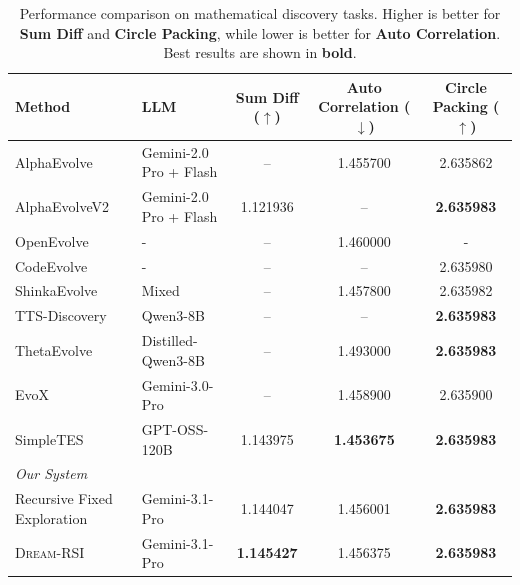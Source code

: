 
\begin{table}[t!]
\centering
\caption{
Performance comparison on mathematical discovery tasks.
Higher is better for \textbf{Sum Diff} and \textbf{Circle Packing}, while lower is better for \textbf{Auto Correlation}.
Best results are shown in \textbf{bold}.
}
\label{tab:downstream_results}
\small
\setlength{\tabcolsep}{1pt}
\renewcommand{\arraystretch}{1.15}
\vspace{0.1in}
\begin{tabular}{llccc}
\toprule
\textbf{Method}
& \textbf{LLM}
& \textbf{Sum Diff ($\uparrow$)}
& \textbf{Auto Correlation ($\downarrow$)}
& \textbf{Circle Packing ($\uparrow$)} \\
\midrule

AlphaEvolve
& Gemini-2.0 Pro + Flash 
& -- &  1.455700 &  2.635862 \\

AlphaEvolveV2
& Gemini-2.0 Pro + Flash 
& 1.121936 & -- & \textbf{2.635983} \\

OpenEvolve 
& - 
& -- &  1.460000 &  - \\

CodeEvolve 
& -
& -- & -- & 2.635980 \\

ShinkaEvolve 
& Mixed 
& -- &  1.457800 &  2.635982 \\

TTS-Discovery
& Qwen3-8B 
& -- & -- &  \textbf{2.635983} \\

ThetaEvolve
& Distilled-Qwen3-8B 
& -- & 1.493000 & \textbf{2.635983} \\

EvoX
& Gemini-3.0-Pro 
& -- & 1.458900 & 2.635900 \\

SimpleTES
& GPT-OSS-120B 
& 1.143975 & \bf 1.453675 & \textbf{2.635983} \\


\midrule
\textit{Our System} \\
Recursive Fixed Exploration
& Gemini-3.1-Pro 
& 1.144047 & 1.456001 & \textbf{2.635983} \\

\textsc{Dream-RSI}
& Gemini-3.1-Pro  
& \textbf{1.145427}
& 1.456375
& \textbf{2.635983} \\

\bottomrule
\end{tabular}
\end{table}


